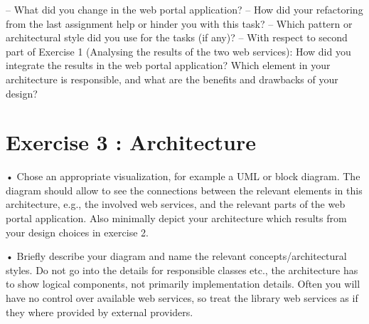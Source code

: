 – What did you change in the web portal application?
– How did your refactoring from the last assignment help or hinder you with
this task?
– Which pattern or architectural style did you use for the tasks (if any)?
– With respect to second part of Exercise 1 (Analysing the results of the two
web services): How did you integrate the results in the web portal application?
Which element in your architecture is responsible, and what are the benefits
and drawbacks of your design?

\section{Exercise 3 : Architecture}

• Chose an appropriate visualization, for example a UML or block diagram. The
diagram should allow to see the connections between the relevant elements in this
architecture, e.g., the involved web services, and the relevant parts of the web
portal application. Also minimally depict your architecture which results from
your design choices in exercise 2.

• Briefly describe your diagram and name the relevant concepts/architectural styles.
Do not go into the details for responsible classes etc., the architecture has to show
logical components, not primarily implementation details. Often you will have no
control over available web services, so treat the library web services as if they where
provided by external providers.
